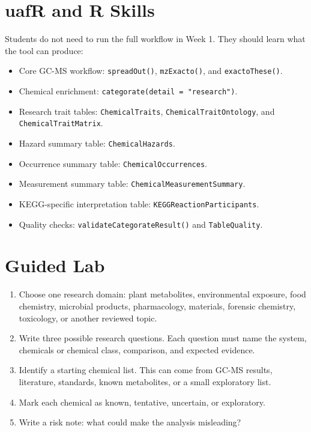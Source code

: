 \section{uafR and R Skills}
Students do not need to run the full workflow in Week 1. They should learn what the tool can produce:
\begin{itemize}
  \item Core GC-MS workflow: \texttt{spreadOut()}, \texttt{mzExacto()}, and \texttt{exactoThese()}.
  \item Chemical enrichment: \texttt{categorate(detail = "research")}.
  \item Research trait tables: \texttt{ChemicalTraits}, \texttt{ChemicalTraitOntology}, and \texttt{ChemicalTraitMatrix}.
  \item Hazard summary table: \texttt{ChemicalHazards}.
  \item Occurrence summary table: \texttt{ChemicalOccurrences}.
  \item Measurement summary table: \texttt{ChemicalMeasurementSummary}.
  \item KEGG-specific interpretation table: \texttt{KEGGReactionParticipants}.
  \item Quality checks: \texttt{validateCategorateResult()} and \texttt{TableQuality}.
\end{itemize}

\section{Guided Lab}
\begin{enumerate}
  \item Choose one research domain: plant metabolites, environmental exposure, food chemistry, microbial products, pharmacology, materials, forensic chemistry, toxicology, or another reviewed topic.
  \item Write three possible research questions. Each question must name the system, chemicals or chemical class, comparison, and expected evidence.
  \item Identify a starting chemical list. This can come from GC-MS results, literature, standards, known metabolites, or a small exploratory list.
  \item Mark each chemical as known, tentative, uncertain, or exploratory.
  \item Write a risk note: what could make the analysis misleading?
\end{enumerate}

